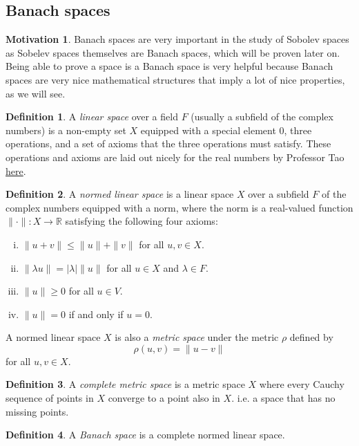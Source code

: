 \documentclass[11pt]{article}
\theoremstyle{definition}
\newtheorem*{definition}{Definition}
\newtheorem*{motivation}{Motivation}
\begin{document}
\newpage

\subsection{Banach spaces}
\begin{motivation}
Banach spaces are very important in the study of Sobolev spaces as Sobelev spaces themselves are Banach spaces, which will be proven later on.
Being able to prove a space is a Banach space is very helpful because Banach spaces are very nice mathematical structures that imply
a lot of nice properties, as we will see.
\end{motivation}
\begin{definition}
	A \textit{linear space} over a field $F$ (usually a subfield of the complex numbers) is a non-empty set $X$ equipped with a special element 0, 
	three operations, and a set of
	axioms that the three operations must satisfy. These operations and axioms are laid out nicely for the real numbers by Professor Tao
	\href{https://www.math.ucla.edu/~tao/resource/general/121.1.00s/vector_axioms.html}{here}.
\end{definition}
\begin{definition}
	A \textit{normed linear space} is a linear space $X$ over a subfield $F$ of the complex numbers equipped with a norm,
	where the norm is a real-valued function $\|\cdot\| : X \rightarrow \mathbb{R}$ satisfying the following four axioms:
	\begin{enumerate}[(i)]
		\item $\|u+v\| \leq \|u\|+\|v\|$ for all $u,v \in X$.
		\item $\|\lambda u\| = |\lambda|\|u\|$ for all $u \in X$ and $\lambda \in F$.
		\item $\|u\| \geq 0$ for all $u \in V$.
		\item $\|u\| = 0$ if and only if $u=0$.
	\end{enumerate}
	A normed linear space $X$ is also a \textit{metric space} under the metric $\rho$ defined by
	\[\rho(u,v) = \|u-v\|\]
	for all $u,v \in X$.
\end{definition}
\begin{definition}
	A \textit{complete metric space} is a metric space $X$ where every Cauchy sequence of points in $X$ converge to a point also in $X$.
	i.e. a space that has no missing points.
\end{definition}
\begin{definition}
	A \textit{Banach space} is a complete normed linear space.
\end{definition}
\end{document}
